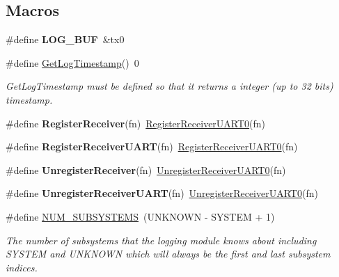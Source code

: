 \subsection*{Macros}
\begin{DoxyCompactItemize}
\item 
\hypertarget{group__subsys_gaf723de738584c5c631981cac7d7d6ae9}{\#define {\bfseries L\+O\+G\+\_\+\+B\+U\+F}~\&tx0}\label{group__subsys_gaf723de738584c5c631981cac7d7d6ae9}

\item 
\hypertarget{group__subsys_ga5ecc8d4d514ebae84adabf96e0517f6f}{\#define \hyperlink{group__subsys_ga5ecc8d4d514ebae84adabf96e0517f6f}{Get\+Log\+Timestamp}()~0}\label{group__subsys_ga5ecc8d4d514ebae84adabf96e0517f6f}

\begin{DoxyCompactList}\small\item\em Get\+Log\+Timestamp must be defined so that it returns a integer (up to 32 bits) timestamp. \end{DoxyCompactList}\item 
\hypertarget{group__subsys_ga2c1e430ba1e34cfd1f6fc97bc26da884}{\#define {\bfseries Register\+Receiver}(fn)~\hyperlink{group__subsys_gab7e855156a8e0dd9472e2c0e141b268a}{Register\+Receiver\+U\+A\+R\+T0}(fn)}\label{group__subsys_ga2c1e430ba1e34cfd1f6fc97bc26da884}

\item 
\hypertarget{group__subsys_gac703facd927c53af44c31fa32aa3548b}{\#define {\bfseries Register\+Receiver\+U\+A\+R\+T}(fn)~\hyperlink{group__subsys_gab7e855156a8e0dd9472e2c0e141b268a}{Register\+Receiver\+U\+A\+R\+T0}(fn)}\label{group__subsys_gac703facd927c53af44c31fa32aa3548b}

\item 
\hypertarget{group__subsys_ga8142e07a8d859f42aa50094b1a4c98a8}{\#define {\bfseries Unregister\+Receiver}(fn)~\hyperlink{group__subsys_ga36215ce96afabbcb83f1a03b13fe0e44}{Unregister\+Receiver\+U\+A\+R\+T0}(fn)}\label{group__subsys_ga8142e07a8d859f42aa50094b1a4c98a8}

\item 
\hypertarget{group__subsys_gae1ff181cb9062b97a2151875c4268c4a}{\#define {\bfseries Unregister\+Receiver\+U\+A\+R\+T}(fn)~\hyperlink{group__subsys_ga36215ce96afabbcb83f1a03b13fe0e44}{Unregister\+Receiver\+U\+A\+R\+T0}(fn)}\label{group__subsys_gae1ff181cb9062b97a2151875c4268c4a}

\item 
\hypertarget{group__subsys_gad914679f013f117ec7470f75fee6149a}{\#define \hyperlink{group__subsys_gad914679f013f117ec7470f75fee6149a}{N\+U\+M\+\_\+\+S\+U\+B\+S\+Y\+S\+T\+E\+M\+S}~(U\+N\+K\+N\+O\+W\+N -\/ S\+Y\+S\+T\+E\+M + 1)}\label{group__subsys_gad914679f013f117ec7470f75fee6149a}

\begin{DoxyCompactList}\small\item\em The number of subsystems that the logging module knows about including S\+Y\+S\+T\+E\+M and U\+N\+K\+N\+O\+W\+N which will always be the first and last subsystem indices. \end{DoxyCompactList}\end{DoxyCompactItemize}

